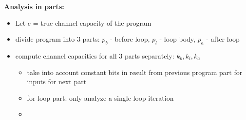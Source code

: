 \textbf{Analysis in parts:}
\begin{itemize}
    \item Let c = true channel capacity of the program
    \item divide program into 3 parts: $p_b$ - before loop, $p_l$ - loop body, $p_a$ - after loop
    \item compute channel capacities for all 3 parts separately: $k_b, k_l, k_a$
    
    \begin{itemize}
        \item take into account constant bits in result from previous program part for inputs for next part
        \item for loop part: only analyze a single loop iteration
        \item {}
    \end{itemize}
    

\end{itemize}
